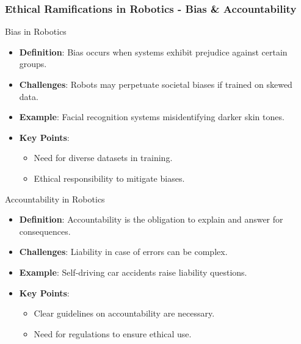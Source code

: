 \documentclass[aspectratio=169]{beamer}
\begin{document}
\begin{frame}[fragile]
    \frametitle{Ethical Ramifications in Robotics - Bias & Accountability}
    \begin{block}{Bias in Robotics}
        \begin{itemize}
            \item \textbf{Definition}: Bias occurs when systems exhibit prejudice against certain groups.
            \item \textbf{Challenges}: Robots may perpetuate societal biases if trained on skewed data.
            \item \textbf{Example}: Facial recognition systems misidentifying darker skin tones.
            \item \textbf{Key Points}:
            \begin{itemize}
                \item Need for diverse datasets in training.
                \item Ethical responsibility to mitigate biases.
            \end{itemize}
        \end{itemize}
    \end{block}
    
    \begin{block}{Accountability in Robotics}
        \begin{itemize}
            \item \textbf{Definition}: Accountability is the obligation to explain and answer for consequences.
            \item \textbf{Challenges}: Liability in case of errors can be complex.
            \item \textbf{Example}: Self-driving car accidents raise liability questions.
            \item \textbf{Key Points}:
            \begin{itemize}
                \item Clear guidelines on accountability are necessary.
                \item Need for regulations to ensure ethical use.
            \end{itemize}
        \end{itemize}
    \end{block}
\end{frame}
\end{document}
